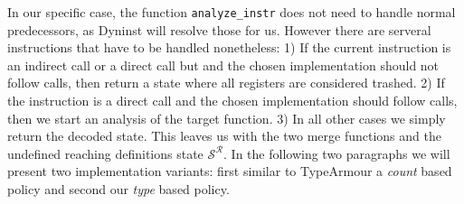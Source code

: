 In our specific case, the function \texttt{analyze\_instr} does not need to handle normal predecessors, as Dyninst will resolve those for us. 
However there are serveral instructions that have to be handled nonetheless: 1) If the current instruction is an indirect call or a direct call 
but and the chosen implementation should not follow calls, then return a state where all registers are considered trashed. 2) If the instruction 
is a direct call and the chosen implementation should follow calls, then we start an analysis of the target function. 3) In all other cases we 
simply return the decoded state. This leaves us with the two merge functions and the undefined reaching definitions state $\mathcal{S}^\mathcal{R}$. 
In the following two paragraphs we will present two implementation variants: first similar to TypeArmour a \emph{count} based policy and second our \emph{type} based policy. 




%
%

